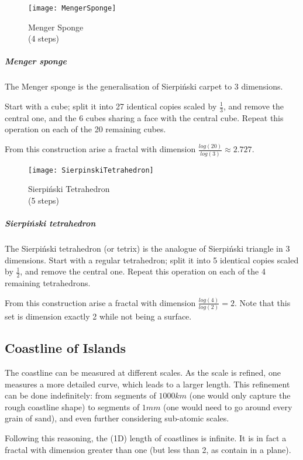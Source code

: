 \begin{wrapfigure}{r}{5.75cm}
	\texttt{[image: MengerSponge]}
	\centering
	\captionsetup{justification=centering}
	\caption{Menger Sponge \\(4 steps)}
	\label{fig:MengerSponge}
	\vspace{-0.5cm}
\end{wrapfigure}
\subparagraph{Menger sponge}
The Menger sponge is the generalisation of Sierpiński carpet to 3 dimensions.

Start with a cube; split it into 27 identical copies scaled by $\frac{1}{3}$, and remove the central one, and the 6 cubes sharing a face with the central cube.
Repeat this operation on each of the 20 remaining cubes.

From this construction arise a fractal with dimension $\frac{log(20)}{log(3)} \approx 2.727$.

\begin{wrapfigure}{r}{5cm}
	\vspace{-0.5cm}
	\texttt{[image: SierpinskiTetrahedron]}
	\centering
	\captionsetup{justification=centering}
	\caption{Sierpiński Tetrahedron \\(5 steps)}
	\label{fig:SierpinskiTetrahedron}
	\vspace{-1.25cm}
\end{wrapfigure}
\subparagraph{Sierpiński tetrahedron}
The Sierpiński tetrahedron (or tetrix) is the analogue of Sierpiński triangle in 3 dimensions.
Start with a regular tetrahedron; split it into 5 identical copies scaled by $\frac{1}{2}$, and remove the central one.
Repeat this operation on each of the 4 remaining tetrahedrons.

From this construction arise a fractal with dimension $\frac{log(4)}{log(2)} = 2$.
Note that this set is dimension exactly 2 while not being a surface.

\subsection{Coastline of Islands}\label{appendix:coastlines}
The coastline can be measured at different scales.
As the scale is refined, one measures a more detailed curve, which leads to a larger length.
This refinement can be done indefinitely: from segments of $1000km$ (one would only capture the rough coastline shape) to segments of $1mm$ (one would need to go around every grain of sand), and even further considering sub-atomic scales.

Following this reasoning, the (1D) length of coastlines is infinite.
It is in fact a fractal with dimension greater than one (but less than 2, as contain in a plane).

